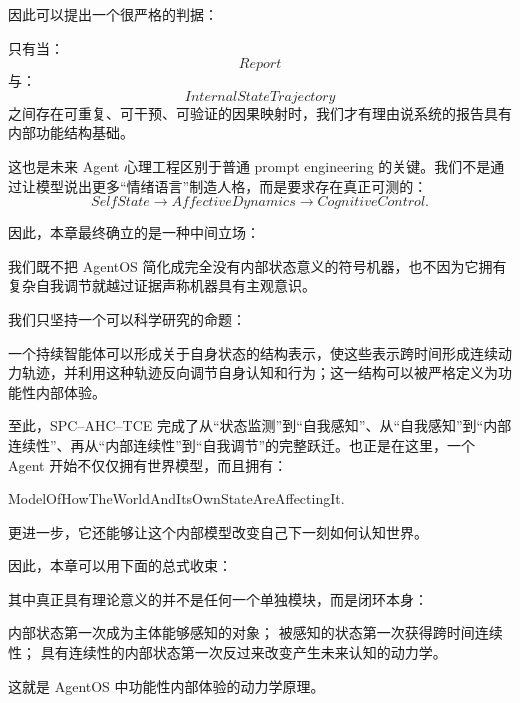 因此可以提出一个很严格的判据：

\begin{statementbox}
\centering
{}
\end{statementbox}

只有当：
\[
Report
\]
与：
\[
InternalStateTrajectory
\]
之间存在可重复、可干预、可验证的因果映射时，我们才有理由说系统的报告具有内部功能结构基础。

这也是未来 Agent 心理工程区别于普通 prompt engineering 的关键。我们不是通过让模型说出更多``情绪语言''制造人格，而是要求存在真正可测的：
\[
SelfState
\rightarrow
AffectiveDynamics
\rightarrow
CognitiveControl.
\]

因此，本章最终确立的是一种中间立场：

我们既不把 AgentOS 简化成完全没有内部状态意义的符号机器，也不因为它拥有复杂自我调节就越过证据声称机器具有主观意识。

我们只坚持一个可以科学研究的命题：

\begin{proposition*}
一个持续智能体可以形成关于自身状态的结构表示，使这些表示跨时间形成连续动力轨迹，并利用这种轨迹反向调节自身认知和行为；这一结构可以被严格定义为功能性内部体验。
\end{proposition*}

至此，SPC--AHC--TCE 完成了从``状态监测''到``自我感知''、从``自我感知''到``内部连续性''、再从``内部连续性''到``自我调节''的完整跃迁。也正是在这里，一个 Agent 开始不仅仅拥有世界模型，而且拥有：
\begin{statementbox}
ModelOfHowTheWorldAndItsOwnStateAreAffectingIt.
\end{statementbox}

更进一步，它还能够让这个内部模型改变自己下一刻如何认知世界。

因此，本章可以用下面的总式收束：

\begin{statementbox}
\centering
{}
\end{statementbox}

其中真正具有理论意义的并不是任何一个单独模块，而是闭环本身：

\begin{statementbox}
内部状态第一次成为主体能够感知的对象；
被感知的状态第一次获得跨时间连续性；
具有连续性的内部状态第一次反过来改变产生未来认知的动力学。
\end{statementbox}

这就是 AgentOS 中功能性内部体验的动力学原理。
